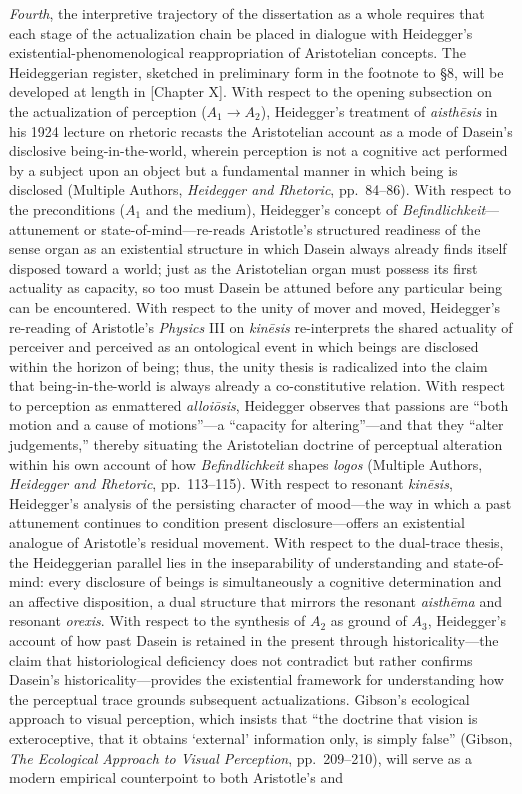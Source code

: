 \documentclass[12pt]{article}
\begin{document}
\textit{Fourth}, the interpretive trajectory of the dissertation as a whole requires that each stage of the actualization chain be placed in dialogue with Heidegger's existential-phenomenological reappropriation of Aristotelian concepts. The Heideggerian register, sketched in preliminary form in the footnote to §8, will be developed at length in [Chapter X]. With respect to the opening subsection on the actualization of perception ($A_1 \to A_2$), Heidegger's treatment of \textit{aisthēsis} in his 1924 lecture on rhetoric recasts the Aristotelian account as a mode of Dasein's disclosive being-in-the-world, wherein perception is not a cognitive act performed by a subject upon an object but a fundamental manner in which being is disclosed (Multiple Authors, \textit{Heidegger and Rhetoric}, pp.~84--86). With respect to the preconditions ($A_1$ and the medium), Heidegger's concept of \textit{Befindlichkeit}---attunement or state-of-mind---re-reads Aristotle's structured readiness of the sense organ as an existential structure in which Dasein always already finds itself disposed toward a world; just as the Aristotelian organ must possess its first actuality as capacity, so too must Dasein be attuned before any particular being can be encountered. With respect to the unity of mover and moved, Heidegger's re-reading of Aristotle's \textit{Physics} III on \textit{kinēsis} re-interprets the shared actuality of perceiver and perceived as an ontological event in which beings are disclosed within the horizon of being; thus, the unity thesis is radicalized into the claim that being-in-the-world is always already a co-constitutive relation. With respect to perception as enmattered \textit{alloiōsis}, Heidegger observes that passions are ``both motion and a cause of motions''---a ``capacity for altering''---and that they ``alter judgements,'' thereby situating the Aristotelian doctrine of perceptual alteration within his own account of how \textit{Befindlichkeit} shapes \textit{logos} (Multiple Authors, \textit{Heidegger and Rhetoric}, pp.~113--115). With respect to resonant \textit{kinēsis}, Heidegger's analysis of the persisting character of mood---the way in which a past attunement continues to condition present disclosure---offers an existential analogue of Aristotle's residual movement. With respect to the dual-trace thesis, the Heideggerian parallel lies in the inseparability of understanding and state-of-mind: every disclosure of beings is simultaneously a cognitive determination and an affective disposition, a dual structure that mirrors the resonant \textit{aisthēma} and resonant \textit{orexis}. With respect to the synthesis of $A_2$ as ground of $A_3$, Heidegger's account of how past Dasein is retained in the present through historicality---the claim that historiological deficiency does not contradict but rather confirms Dasein's historicality---provides the existential framework for understanding how the perceptual trace grounds subsequent actualizations. Gibson's ecological approach to visual perception, which insists that ``the doctrine that vision is exteroceptive, that it obtains `external' information only, is simply false'' (Gibson, \textit{The Ecological Approach to Visual Perception}, pp.~209--210), will serve as a modern empirical counterpoint to both Aristotle's and 
\end{document}
